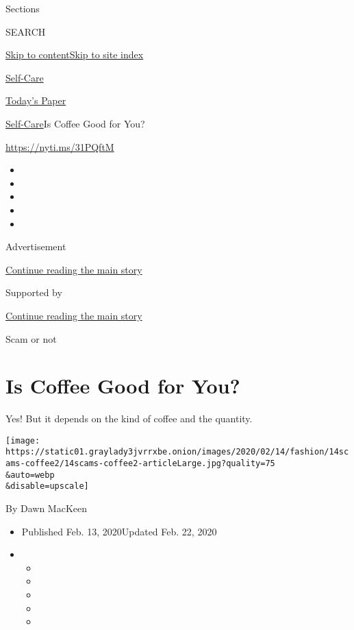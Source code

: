 Sections

SEARCH

\protect\hyperlink{site-content}{Skip to
content}\protect\hyperlink{site-index}{Skip to site index}

\href{https://www.nytimes3xbfgragh.onion/section/style/self-care/}{Self-Care}

\href{https://myaccount.nytimes3xbfgragh.onion/auth/login?response_type=cookie\&client_id=vi}{}

\href{https://www.nytimes3xbfgragh.onion/section/todayspaper}{Today's
Paper}

\href{/section/style/self-care/}{Self-Care}\textbar{}Is Coffee Good for
You?

\url{https://nyti.ms/31PQftM}

\begin{itemize}
\item
\item
\item
\item
\item
\end{itemize}

Advertisement

\protect\hyperlink{after-top}{Continue reading the main story}

Supported by

\protect\hyperlink{after-sponsor}{Continue reading the main story}

Scam or not

\hypertarget{is-coffee-good-for-you}{%
\section{Is Coffee Good for You?}\label{is-coffee-good-for-you}}

Yes! But it depends on the kind of coffee and the quantity.

\texttt{[image: https://static01.graylady3jvrrxbe.onion/images/2020/02/14/fashion/14scams-coffee2/14scams-coffee2-articleLarge.jpg?quality=75\\\&auto=webp\\\&disable=upscale]}

By Dawn MacKeen

\begin{itemize}
\item
  Published Feb. 13, 2020Updated Feb. 22, 2020
\item
  \begin{itemize}
  \item
  \item
  \item
  \item
  \item
  \end{itemize}
\end{itemize}

